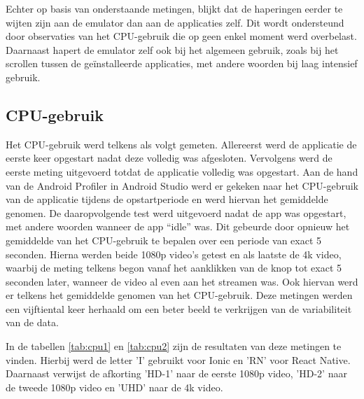 Echter op basis van onderstaande metingen, blijkt dat de haperingen eerder te wijten zijn aan de emulator dan aan de applicaties zelf. Dit wordt ondersteund door observaties van het CPU-gebruik die op geen enkel moment werd overbelast. Daarnaast hapert de emulator zelf ook bij het algemeen gebruik, zoals bij het scrollen tussen de geïnstalleerde applicaties, met andere woorden bij laag intensief gebruik.


\subsection{CPU-gebruik}
\label{subsec:cpu-gebruik}

Het CPU-gebruik werd telkens als volgt gemeten. Allereerst werd de applicatie de eerste keer opgestart nadat deze volledig was afgesloten. Vervolgens werd de eerste meting uitgevoerd totdat de applicatie volledig was opgestart. Aan de hand van de Android Profiler in Android Studio werd er gekeken naar het CPU-gebruik van de applicatie tijdens de opstartperiode en werd hiervan het gemiddelde genomen. De daaropvolgende test werd uitgevoerd nadat de app was opgestart, met andere woorden wanneer de app ``idle'' was. Dit gebeurde door opnieuw het gemiddelde van het CPU-gebruik te bepalen over een periode van exact 5 seconden. Hierna werden beide 1080p video's getest en als laatste de 4k video, waarbij de meting telkens begon vanaf het aanklikken van de knop tot exact 5 seconden later, wanneer de video al even aan het streamen was. Ook hiervan werd er telkens het gemiddelde genomen van het CPU-gebruik. Deze metingen werden een vijftiental keer herhaald om een beter beeld te verkrijgen van de variabiliteit van de data.

In de tabellen \ref{tab:cpu1} en \ref{tab:cpu2} zijn de resultaten van deze metingen te vinden. Hierbij werd de letter 'I' gebruikt voor Ionic en 'RN' voor React Native. Daarnaast verwijst de afkorting 'HD-1' naar de eerste 1080p video, 'HD-2' naar de tweede 1080p video en 'UHD' naar de 4k video.


